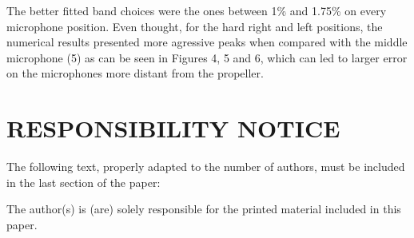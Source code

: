 \documentclass[10pt,fleqn,a4paper,twoside]{article}
\begin{document}
The better fitted band choices were the ones between 1\% and 1.75\% on every microphone position. Even thought, for the hard right and left positions, the numerical results presented more agressive peaks when compared with the middle microphone (5) as can be seen in Figures 4, 5 and 6, which can led to larger error on the microphones more distant from the propeller. 




\renewcommand{\refname}{}


\section{RESPONSIBILITY NOTICE}

The following text, properly adapted to the number of authors, must be included in the last section of the paper:

The author(s) is (are) solely responsible for the printed material included in this paper.
\end{document}
